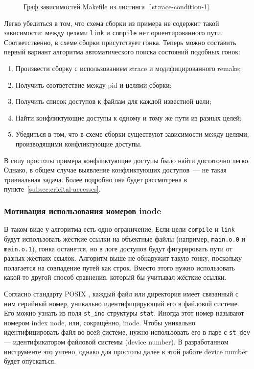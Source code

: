 \begin{figure}[H]
	\centering
	
    \caption{Граф зависимостей Makefile из листинга~\ref{lst:race-condition-1}}
    \label{fig:dependency-graph}
\end{figure}

Легко убедиться в том, что схема сборки из примера не содержит такой зависимости: между целями \texttt{link} и \texttt{compile} нет ориентированного пути. Соответственно, в схеме сборки присутствует гонка. Теперь можно составить первый вариант алгоритма автоматического поиска состояний подобных гонок:

\begin{enumerate}
	\item Произвести сборку с использованием strace и модифицированного remake;
	\item Получить соответствие между pid и целями сборки;
	\item Получить список доступов к файлам для каждой известной цели;
	\item Найти конфликтующие доступы к одному и тому же пути из разных целей;
	\item Убедиться в том, что в схеме сборки существуют зависимости между целями, производящими конфликтующие доступы.
\end{enumerate}

В силу простоты примера конфликтующие доступы было найти достаточно легко. Однако, в общем случае выявление конфликтующих доступов~--- не такая тривиальная задача. Более подробно она будет рассмотрена в пункте~\ref{subsec:cricital-accesses}.

\subsubsection{Мотивация использования номеров inode}
\label{subsubsec:why-inodes}

В таком виде у алгоритма есть одно ограничение. Если цели \texttt{compile} и \texttt{link} будут использовать жёсткие ссылки на объектные файлы (например, \texttt{main.o.0} и \texttt{main.o.1}), гонка останется, но в логе доступов будут фигурировать пути от разных жёстких ссылок. Алгоритм выше не обнаружит такую гонку, поскольку полагается на совпадение путей как строк. Вместо этого нужно использовать какой-то другой способ сравнения, который бы учитывал жёсткие ссылки.

Согласно стандарту POSIX \cite{8277153}, каждый файл или директория имеет связанный с ним серийный номер, уникально идентифицирующий его в файловой системе. Его можно узнать из поля \texttt{st\_ino} структуры \texttt{stat}. Иногда этот номер называют номером index node, или, сокращённо, inode. Чтобы уникально идентифицировать файл во всей системе, нужно использовать его в паре с \texttt{st\_dev} --- идентификатором файловой системы (device number). В разработанном инструменте это учтено, однако для простоты далее в этой работе device number будет опускаться.

